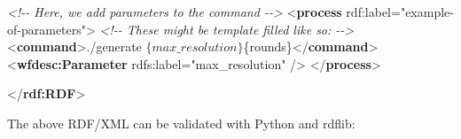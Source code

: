 \documentclass[manuscript]{acmart}
\newenvironment{Shaded}{}{}
\newcommand{\CommentTok}[1]{\textcolor[rgb]{0.38,0.63,0.69}{\textit{#1}}}
\newcommand{\KeywordTok}[1]{\textcolor[rgb]{0.00,0.44,0.13}{\textbf{#1}}}
\newcommand{\NormalTok}[1]{#1}
\newcommand{\OtherTok}[1]{\textcolor[rgb]{0.00,0.44,0.13}{#1}}
\newcommand{\StringTok}[1]{\textcolor[rgb]{0.25,0.44,0.63}{#1}}
\begin{document}
\begin{Shaded}
\begin{Highlighting}[]
  \CommentTok{\textless{}!{-}{-} Here, we add parameters to the command {-}{-}\textgreater{}}
\NormalTok{  \textless{}}\KeywordTok{process}\OtherTok{ rdf:label=}\StringTok{"example{-}of{-}parameters"}\NormalTok{\textgreater{}}
    \CommentTok{\textless{}!{-}{-} These might be template filled like so: {-}{-}\textgreater{}}
\NormalTok{    \textless{}}\KeywordTok{command}\NormalTok{\textgreater{}./generate $\{max\_resolution\} $\{rounds\}\textless{}/}\KeywordTok{command}\NormalTok{\textgreater{}}
\NormalTok{    \textless{}}\KeywordTok{wfdesc:Parameter}\OtherTok{ rdfs:label=}\StringTok{"max\_resolution"}\NormalTok{ /\textgreater{}}
\NormalTok{  \textless{}/}\KeywordTok{process}\NormalTok{\textgreater{}}

\NormalTok{\textless{}/}\KeywordTok{rdf:RDF}\NormalTok{\textgreater{}}
\end{Highlighting}
\end{Shaded}

\normalsize

The above RDF/XML can be validated with Python and rdflib:
\end{document}
